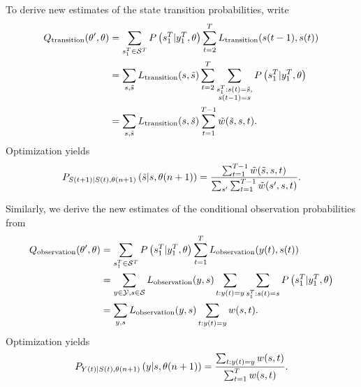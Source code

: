To derive new estimates of the state transition probabilities, write
\begin{align}
  Q_{\text{transition}} (\parameters',\parameters) &=
  \sum_{\ts{s}{1}{T}\in\states^T} P
  \left(\ts{s}{1}{T}|\ts{y}{1}{T},\parameters \right) \sum_{t=2}^T
  L_{\text{transition}}(\ti{s}{t-1},\ti{s}{t})\\
  &= \sum_{s,{\tilde s}} L_{\text{transition}}(s,{\tilde s})
  \sum_{t=2}^T \sum_{\substack{\ts{s}{1}{T}:\ti{s}{t}={\tilde
        s},\\\ti{s}{t-1}=s}}
  P\left(\ts{s}{1}{T}|\ts{y}{1}{T},\parameters \right)\\
  &= \sum_{s,{\tilde s}} L_{\text{transition}}(s,{\tilde s})
  \sum_{t=1}^{T-1} {\tilde w}({\tilde s},s,t).
\end{align}
Optimization yields
\begin{equation}
  \label{eq:NewTrans}
  P_{{S}{(t+1)}|{S}{(t)},{\theta}{(n+1)}} \left({\tilde
      s}|s,{\theta}{(n+1)} \right) = \frac
  {\sum_{t=1}^{T-1} {\tilde w}({\tilde s},s,t)} {\sum_{s'}
    \sum_{t=1}^{T-1} {\tilde w}(s',s,t)}.
\end{equation}

Similarly, we derive the new estimates of the conditional observation
probabilities from
\begin{align}
  \label{eq:Qout1}
  Q_{\text{observation}} (\parameters',\parameters) &=
  \sum_{\ts{s}{1}{T}\in\states^T} P
  \left(\ts{s}{1}{T}|\ts{y}{1}{T},\parameters \right) \sum_{t=1}^T
  L_{\text{observation}}(\ti{y}{t},\ti{s}{t})\\
  &= \sum_{y\in\outputs,s\in\states} L_{\text{observation}}(y,s)
  \sum_{t:\ti{y}{t}=y}
  \sum_{\ts{s}{1}{T}:\ti{s}{t}=s }P
  \left(\ts{s}{1}{T}|\ts{y}{1}{T},\parameters \right) \\
  &= \sum_{y,s} L_{\text{observation}}(y,s) \sum_{t:\ti{y}{t}=y} w(s,t).
\end{align}
Optimization yields
\begin{equation}
  \label{eq:NewOut}
  P_{{Y}{(t)}|{S}{(t)},{\theta}{(n+1)}}
  \left(y|s,{\theta}{(n+1)} \right) = \frac
  {\sum_{t:{y}{(t)}=y} w(s,t)} {\sum_{t=1}^T w(s,t)}.
\end{equation}

